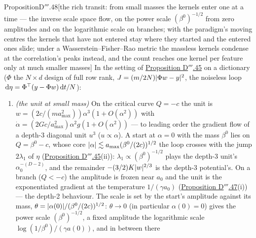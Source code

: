 \begin{thm}{Proposition}{D$'''$.48}[the rich transit: from small masses the kernels enter one at a time --- the inverse
scale space flow, on the power scale $(\beta^0)^{-1/2}$ from zero amplitudes and on the logarithmic scale on branches;
with the paradigm's moving centres the kernels that have not entered stay where they started and the entered ones slide;
under a Wasserstein--Fisher--Rao metric the massless kernels condense at the correlation's peaks instead, and the count
reaches one kernel per feature only at much smaller masses]\label{res:thmDppp:48}%
In the setting of \hyperref[res:thmDppp:45]{Proposition D$'''$.45} on a dictionary ($\Phi$ the $N\times d$ design of
full row rank, $J = (m/2N)\lvert \Phi w - y\rvert^2$, the noiseless loop $\,\mathrm{d}\eta = \Phi^\top(y - \Phi w)\,\mathrm{d} t/N$):
\begin{enumerate}[label=\textup{(\roman*)}]
  \item[\textup{(o)}] \emph{(the unit at small mass)} On the critical curve $Q = -c$ the unit is
    $w = (2c/(ma_{\max}^2))\alpha^3(1 + O(\alpha^2))$ with $\dot\alpha = (2Gc/a_{\max}^2)\alpha^2g(1 + O(\alpha^2))$ --- to
    leading order the gradient flow of a depth-3 diagonal unit $u^3$ ($u\propto\alpha$). A start at $\alpha = 0$ with
    the mass $\beta^0$ lies on $Q = \beta^0 - c$, whose core $\lvert \alpha\rvert\lesssim a_{\max}(\beta^0/(2c))^{1/2}$ the loop
    crosses with the jump $2\lambda_1$ of $\eta$ (\hyperref[res:thmDppp:45]{Proposition D$'''$.45}(ii)):
    $\lambda_1\propto(\beta^0)^{-1/2}$ plays the depth-3 unit's $\alpha_0^{-(D-2)}$, and the remainder
    $-(3/2)K\lvert w\rvert^{2/3}$ is the depth-3 potential's. On a branch ($Q < -c$) the amplitude is frozen near $a_0$ and the
    unit is the exponentiated gradient at the temperature $1/(\gamma a_0)$ (\hyperref[res:thmDppp:47]{Proposition
    D$'''$.47}(i)) --- the depth-2 behaviour. The scale is set by the start's amplitude against its mass,
    $\theta = \lvert \alpha(0)\rvert/(\beta^0/(2c))^{1/2}$: $\theta\to0$ (in particular $\alpha(0) = 0$) gives the power scale
    $(\beta^0)^{-1/2}$, a fixed amplitude the logarithmic scale $\log(1/\beta^0)/(\gamma a(0))$, and in between there

\end{enumerate}
\end{thm}
